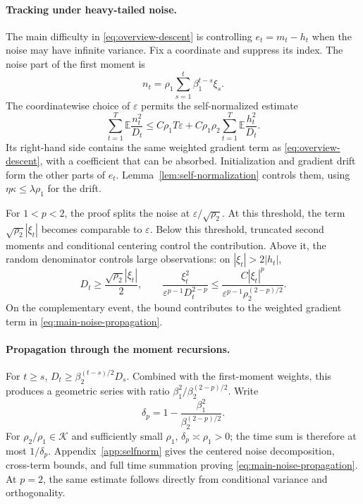 \documentclass[11pt,letterpaper]{article}
\theoremstyle{definition}
\newcommand{\E}{\mathbb E}
\newcommand{\eps}{\varepsilon}
\begin{document}
\paragraph{Tracking under heavy-tailed noise.}
The main difficulty in \eqref{eq:overview-descent} is controlling
$e_t=m_t-h_t$ when the noise may have infinite variance.
Fix a coordinate and suppress its index. The noise part of the first
moment is
\[
n_t=\rho_1\sum_{s=1}^t\beta_1^{t-s}\xi_s.
\]
The coordinatewise choice of $\eps$ permits the self-normalized estimate
\begin{equation}
\sum_{t=1}^T\E\frac{n_t^2}{D_t}
\le C\rho_1T\eps+
C\rho_1\rho_2\sum_{t=1}^T\E\frac{h_t^2}{D_t}.
\label{eq:main-noise-propagation}
\end{equation}
Its right-hand side contains the same weighted gradient term as
\eqref{eq:overview-descent}, with a coefficient that can be absorbed.
Initialization and gradient drift form the other parts of $e_t$.
Lemma~\ref{lem:self-normalization} controls them, using
$\eta\kappa\le\lambda\rho_1$ for the drift.

For $1<p<2$, the proof splits the noise at $\eps/\sqrt{\rho_2}$.
At this threshold, the term $\sqrt{\rho_2}|\xi_t|$ becomes comparable to $\eps$.
Below this threshold, truncated second moments and conditional centering
control the contribution. Above it, the random denominator controls
large observations: on $|\xi_t|>2|h_t|$,
\[
D_t\ge\frac{\sqrt{\rho_2}|\xi_t|}{2},\qquad
\frac{\xi_t^2}{\eps^{p-1}D_t^{2-p}}
\le\frac{C|\xi_t|^p}{\eps^{p-1}\rho_2^{(2-p)/2}}.
\]
On the complementary event, the bound contributes to the weighted
gradient term in \eqref{eq:main-noise-propagation}.

\paragraph{Propagation through the moment recursions.}
For $t\ge s$, $D_t\ge\beta_2^{(t-s)/2}D_s$.
Combined with the first-moment weights, this produces a geometric series
with ratio $\beta_1^2/\beta_2^{(2-p)/2}$. Write
\begin{equation}
\delta_p=1-\frac{\beta_1^2}{\beta_2^{(2-p)/2}}.
\label{eq:delta}
\end{equation}
For $\rho_2/\rho_1\in\mathcal K$ and sufficiently small $\rho_1$,
$\delta_p\asymp\rho_1>0$; the time sum is therefore at most $1/\delta_p$.
Appendix~\ref{app:selfnorm} gives the centered noise decomposition,
cross-term bounds, and full time summation proving
\eqref{eq:main-noise-propagation}. At $p=2$, the same estimate follows
directly from conditional variance and orthogonality.
\end{document}
